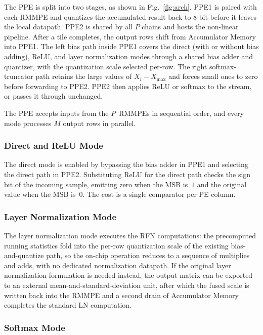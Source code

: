 \documentclass[lettersize,journal]{IEEEtran}
\begin{document}
The PPE is split into two stages, as shown in Fig.~\ref{fig:arch}. PPE1 is paired with each RMMPE and quantizes the accumulated result back to 8-bit before it leaves the local datapath. PPE2 is shared by all $P$ chains and hosts the non-linear pipeline. After a tile completes, the output rows shift from Accumulator Memory into PPE1. The left bias path inside PPE1 covers the direct (with or without bias adding), ReLU, and layer normalization modes through a shared bias adder and quantizer, with the quantization scale selected per-row. The right softmax-truncator path retains the large values of $X_{i}{-}X_{\max}$ and forces small ones to zero before forwarding to PPE2. PPE2 then applies ReLU or softmax to the stream, or passes it through unchanged.

The PPE accepts inputs from the $P$~RMMPEs in sequential order, and every mode processes $M$ output rows in parallel.

\subsubsection{Direct and ReLU Mode}
\label{sec:arch-ppe-direct}

The direct mode is enabled by bypassing the bias adder in PPE1 and selecting the direct path in PPE2. Substituting ReLU for the direct path checks the sign bit of the incoming sample, emitting zero when the MSB is~$1$ and the original value when the MSB is~$0$. The cost is a single comparator per PE column.

\subsubsection{Layer Normalization Mode}
\label{sec:arch-ppe-ln}

The layer normalization mode executes the RFN computations: the precomputed running statistics fold into the per-row quantization scale of the existing bias-and-quantize path, so the on-chip operation reduces to a sequence of multiplies and adds, with no dedicated normalization datapath. If the original layer normalization formulation is needed instead, the output matrix can be exported to an external mean-and-standard-deviation unit, after which the fused scale is written back into the RMMPE and a second drain of Accumulator Memory completes the standard LN computation.

\subsubsection{Softmax Mode}
\label{sec:arch-ppe-softmax}
\end{document}
